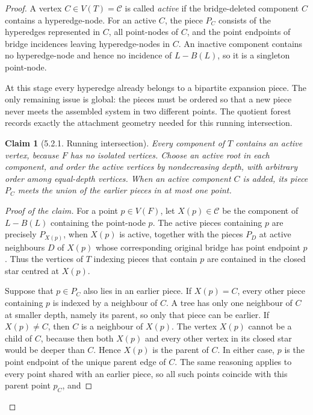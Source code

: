 \documentclass[a4paper,11pt,reqno]{amsart}
\theoremstyle{plain}
\newtheorem*{claim}{Claim}
\theoremstyle{definition}
\theoremstyle{remark}
\begin{document}
\begin{proof}
A vertex \(C\in V(T)=\mathscr C\) is called \emph{active} if the bridge-deleted component \(C\) contains a hyperedge-node. For an active \(C\), the piece \(P_C\) consists of the hyperedges represented in \(C\), all point-nodes of \(C\), and the point endpoints of bridge incidences leaving hyperedge-nodes in \(C\). An inactive component contains no hyperedge-node and hence no incidence of \(L-B(L)\), so it is a singleton point-node.

At this stage every hyperedge already belongs to a bipartite expansion piece.
The only remaining issue is global: the pieces must be ordered so that a new
piece never meets the assembled system in two different points. The quotient
forest records exactly the attachment geometry needed for this running
intersection.

\begin{claim}[5.2.1. Running intersection]

Every component of \(T\) contains an active vertex, because \(F\) has no isolated vertices. Choose an active root in each component, and order the active vertices by nondecreasing depth, with arbitrary order among equal-depth vertices. When an active component \(C\) is added, its piece \(P_C\) meets the union of the earlier pieces in at most one point.

\end{claim}
\begin{proof}[Proof of the claim]
For a point \(p\in V(F)\), let \(X(p)\in\mathscr C\) be the component of \(L-B(L)\) containing the point-node \(p\). The active pieces containing \(p\) are precisely \(P_{X(p)}\), when \(X(p)\) is active, together with the pieces \(P_D\) at active neighbours \(D\) of \(X(p)\) whose corresponding original bridge has point endpoint \(p\). Thus the vertices of \(T\) indexing pieces that contain \(p\) are contained in the closed star centred at \(X(p)\).

Suppose that \(p\in P_C\) also lies in an earlier piece. If \(X(p)=C\),
every other piece containing \(p\) is indexed by a neighbour of \(C\). A tree
has only one neighbour of \(C\) at smaller depth, namely its parent, so only
that piece can be earlier. If \(X(p)\ne C\), then \(C\) is a neighbour of
\(X(p)\). The vertex \(X(p)\) cannot be a child of \(C\), because then both
\(X(p)\) and every other vertex in its closed star would be deeper than
\(C\). Hence \(X(p)\) is the parent of \(C\). In either case, \(p\) is the
point endpoint of the unique parent edge of \(C\). The same reasoning applies
to every point shared with an earlier piece, so all such points coincide with
this parent point \(p_C\), and


\end{proof}
\end{proof}
\end{document}
